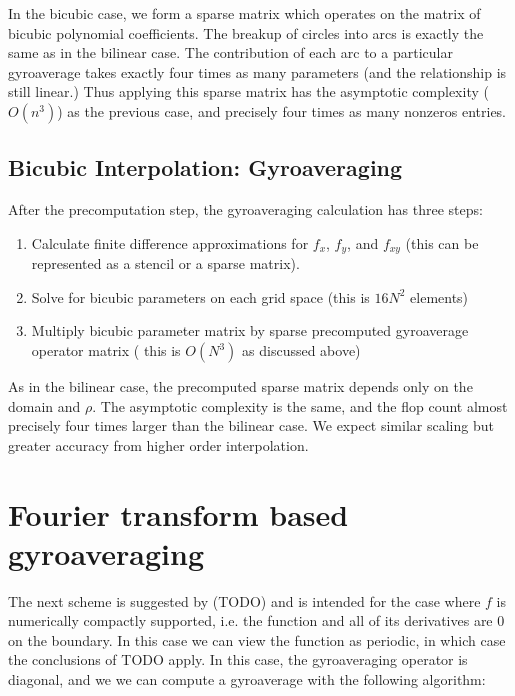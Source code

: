 In the bicubic case, we form a sparse matrix which operates on the matrix of bicubic polynomial coefficients.  The breakup of circles into arcs is exactly the same as in the bilinear case.  The contribution of each arc to a particular gyroaverage takes exactly four times as many parameters (and the relationship is still linear.)  Thus applying this sparse matrix has the asymptotic complexity ($O(n^3)$) as the previous case, and precisely four times as many nonzeros entries.  

\subsection{Bicubic Interpolation:  Gyroaveraging}
After the precomputation step, the gyroaveraging calculation has three steps:
\begin{enumerate}
	\item Calculate finite difference approximations for $f_x$, $f_y$, and $f_{xy}$ (this can be represented as a stencil or a sparse matrix).  
	\item Solve for bicubic parameters on each grid space (this is $16N^2$ elements)
	\item Multiply bicubic parameter matrix by sparse precomputed gyroaverage operator matrix ( this is $O(N^3)$ as discussed above)
\end{enumerate}
As in the bilinear case, the precomputed sparse matrix depends only on the domain and $\rho$.  The asymptotic complexity is the same, and the flop count almost precisely four times larger than the bilinear case.  We expect similar scaling but greater accuracy from higher order interpolation.  

\section{Fourier transform based gyroaveraging}
The next scheme is suggested by (TODO)
and is intended for the case where $f$ is numerically compactly supported, i.e. the function and all of its derivatives are 0 on the boundary.  In this case we can view the function as periodic, in which case the conclusions of TODO apply.  In this case, the gyroaveraging operator is diagonal, and we we can compute a gyroaverage with the following algorithm:  

